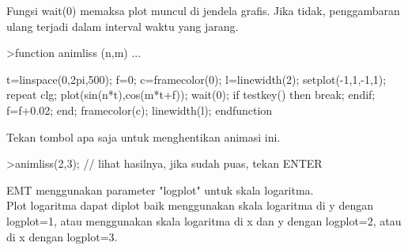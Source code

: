\documentclass[a4paper,10pt]{article}
\begin{document}
\begin{eulernotebook}
\begin{eulercomment}
\begin{eulercomment}
\begin{eulercomment}
\begin{eulercomment}
\begin{eulercomment}
\begin{eulercomment}
\begin{eulercomment}
\begin{eulercomment}
\begin{eulercomment}
\begin{eulercomment}
\begin{eulercomment}
\begin{eulercomment}
\begin{eulercomment}
\begin{eulercomment}
\begin{eulercomment}
Fungsi wait(0) memaksa plot muncul di jendela grafis. Jika tidak,
penggambaran ulang terjadi dalam interval waktu yang jarang.
\end{eulercomment}
\begin{eulerprompt}
>function animliss (n,m) ...
\end{eulerprompt}
\begin{eulerudf}
  t=linspace(0,2pi,500);
  f=0;
  c=framecolor(0);
  l=linewidth(2);
  setplot(-1,1,-1,1);
  repeat
    clg;
    plot(sin(n*t),cos(m*t+f));
    wait(0);
    if testkey() then break; endif;
    f=f+0.02;
  end;
  framecolor(c);
  linewidth(l);
  endfunction
\end{eulerudf}
\begin{eulercomment}
Tekan tombol apa saja untuk menghentikan animasi ini.
\end{eulercomment}
\begin{eulerprompt}
>animliss(2,3); // lihat hasilnya, jika sudah puas, tekan ENTER
\end{eulerprompt}
\begin{eulercomment}
EMT menggunakan parameter "logplot" untuk skala logaritma.\\
Plot logaritma dapat diplot baik menggunakan skala logaritma di y
dengan logplot=1, atau menggunakan skala logaritma di x dan y dengan
logplot=2, atau di x dengan logplot=3.


\end{eulercomment}
\end{eulercomment}
\end{eulercomment}
\end{eulercomment}
\end{eulercomment}
\end{eulercomment}
\end{eulercomment}
\end{eulercomment}
\end{eulercomment}
\end{eulercomment}
\end{eulercomment}
\end{eulercomment}
\end{eulercomment}
\end{eulercomment}
\end{eulercomment}
\end{eulernotebook}
\end{document}
